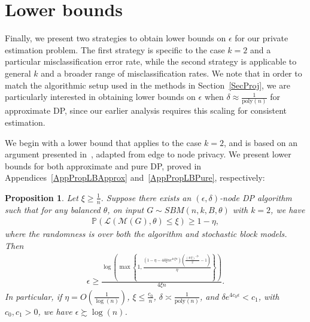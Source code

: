 \documentclass{article}
\newtheorem{proposition}{Proposition}
\begin{document}
\section{Lower bounds}
\label{SecLower}

Finally, we present two strategies to obtain lower bounds on $\epsilon$ for our private estimation problem. The first strategy is specific to the case $k=2$ and a particular misclassification error rate, while the second strategy is applicable to general $k$ and a broader range of misclassification rates. We note that in order to match the algorithmic setup used in the methods in Section~\ref{SecProj}, we are particularly interested in obtaining lower bounds on $\epsilon$ when $\delta \approx \frac{1}{\text{poly}(n)}$ for approximate DP, since our earlier analysis requires this scaling for consistent estimation.


We begin with a lower bound that applies to the case $k = 2$, and is based on an argument presented in~\cite{CheEtal23}, adapted from edge to node privacy. We present lower bounds for both approximate and pure DP, proved in Appendices~\ref{AppPropLBApprox} and~\ref{AppPropLBPure}, respectively:

\begin{proposition}
\label{prop:LB_Chen_eps_delt}
Let $\xi \geq\frac{1}{n}$. Suppose there exists an $(\epsilon, \delta)$-node DP algorithm such that for any balanced $\theta$, on input $G \sim SBM(n, k, B, \theta)$ with $k=2$, we have 
\begin{align*}
\mathbb{P}(\mathcal{L}(\mathcal{M}(G), \theta) \leq \xi) \geq 1 - \eta,
\end{align*}
where the randomness is over both the algorithm and stochastic block models. Then
\begin{align*}
\epsilon \geq \frac{\log\left(\max\left\{1, \frac{(1 - \eta - 4\delta\xi n e^{4\epsilon\xi n})\left(\frac{(4e\xi)^{-\xi n}}{2} - 1\right)}{\eta}\right\}\right)}{4\xi n}.
\end{align*}
In particular, if $\eta = O\left(\frac{1}{\log(n)}\right)$, $\xi \leq \frac{c_0}{n}$, $\delta \asymp \frac{1}{\mathrm{poly}(n)}$, and $\delta e^{4c_0\epsilon} < c_1$, with $c_0, c_1 > 0$, we have $\epsilon \succsim \log(n)$.
\end{proposition}
\end{document}
